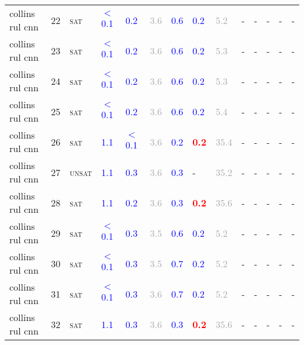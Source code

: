\begin{center}
{\begin{longtable}{@{}llllllllllllll@{}}
collins rul cnn & 22 & \textsc{sat} & \textcolor{blue}{$<$0.1} & \textcolor{blue}{0.2} & \textcolor{darkgray}{3.6} & \textcolor{blue}{0.6} & \textcolor{blue}{0.2} & \textcolor{darkgray}{5.2} & - & - & - & - & - \\
collins rul cnn & 23 & \textsc{sat} & \textcolor{blue}{$<$0.1} & \textcolor{blue}{0.2} & \textcolor{darkgray}{3.6} & \textcolor{blue}{0.6} & \textcolor{blue}{0.2} & \textcolor{darkgray}{5.3} & - & - & - & - & - \\
collins rul cnn & 24 & \textsc{sat} & \textcolor{blue}{$<$0.1} & \textcolor{blue}{0.2} & \textcolor{darkgray}{3.6} & \textcolor{blue}{0.6} & \textcolor{blue}{0.2} & \textcolor{darkgray}{5.3} & - & - & - & - & - \\
collins rul cnn & 25 & \textsc{sat} & \textcolor{blue}{$<$0.1} & \textcolor{blue}{0.2} & \textcolor{darkgray}{3.6} & \textcolor{blue}{0.6} & \textcolor{blue}{0.2} & \textcolor{darkgray}{5.4} & - & - & - & - & - \\
collins rul cnn & 26 & \textsc{sat} & \textcolor{blue}{1.1} & \textcolor{blue}{$<$0.1} & \textcolor{darkgray}{3.6} & \textcolor{blue}{0.2} & \textbf{\textcolor{red}{0.2}} & \textcolor{darkgray}{35.4} & - & - & - & - & - \\
collins rul cnn & 27 & \textsc{unsat} & \textcolor{blue}{1.1} & \textcolor{blue}{0.3} & \textcolor{darkgray}{3.6} & \textcolor{blue}{0.3} & - & \textcolor{darkgray}{35.2} & - & - & - & - & - \\
collins rul cnn & 28 & \textsc{sat} & \textcolor{blue}{1.1} & \textcolor{blue}{0.2} & \textcolor{darkgray}{3.6} & \textcolor{blue}{0.3} & \textbf{\textcolor{red}{0.2}} & \textcolor{darkgray}{35.6} & - & - & - & - & - \\
collins rul cnn & 29 & \textsc{sat} & \textcolor{blue}{$<$0.1} & \textcolor{blue}{0.3} & \textcolor{darkgray}{3.5} & \textcolor{blue}{0.6} & \textcolor{blue}{0.2} & \textcolor{darkgray}{5.2} & - & - & - & - & - \\
collins rul cnn & 30 & \textsc{sat} & \textcolor{blue}{$<$0.1} & \textcolor{blue}{0.3} & \textcolor{darkgray}{3.5} & \textcolor{blue}{0.7} & \textcolor{blue}{0.2} & \textcolor{darkgray}{5.2} & - & - & - & - & - \\
collins rul cnn & 31 & \textsc{sat} & \textcolor{blue}{$<$0.1} & \textcolor{blue}{0.3} & \textcolor{darkgray}{3.6} & \textcolor{blue}{0.7} & \textcolor{blue}{0.2} & \textcolor{darkgray}{5.2} & - & - & - & - & - \\
collins rul cnn & 32 & \textsc{sat} & \textcolor{blue}{1.1} & \textcolor{blue}{0.3} & \textcolor{darkgray}{3.6} & \textcolor{blue}{0.3} & \textbf{\textcolor{red}{0.2}} & \textcolor{darkgray}{35.6} & - & - & - & - & - \\

\end{longtable}}
\end{center}
